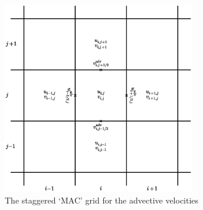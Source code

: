 \begin{figure}[h]
\centering
\includegraphics[width=3.3in]{MAC}
\caption{\label{fig:MAC} The staggered `MAC' grid for the advective
  velocities}
\end{figure}


